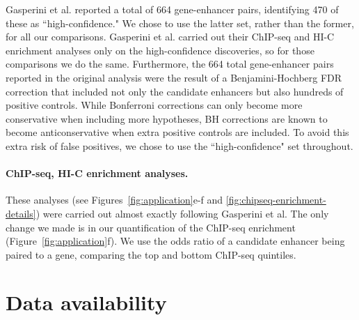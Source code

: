 \documentclass{nature}
\begin{document}
Gasperini et al. reported a total of 664 gene-enhancer pairs, identifying 470 of these as ``high-confidence." We chose to use the latter set, rather than the former, for all our comparisons. Gasperini et al. carried out their ChIP-seq and HI-C enrichment analyses only on the high-confidence discoveries, so for those comparisons we do the same. Furthermore, the 664 total gene-enhancer pairs reported in the original analysis were the result of a Benjamini-Hochberg FDR correction that included not only the candidate enhancers but also hundreds of positive controls. While Bonferroni corrections can only become more conservative when including more hypotheses, BH corrections are known to become anticonservative when extra positive controls are included\cite{FR01}. To avoid this extra risk of false positives, we chose to use the ``high-confidence" set throughout.

\paragraph{ChIP-seq, HI-C enrichment analyses.}

These analyses (see Figures~\ref{fig:application}e-f and \ref{fig:chipseq-enrichment-details}) were carried out almost exactly following Gasperini et al. The only change we made is in our quantification of the ChIP-seq enrichment (Figure~\ref{fig:application}f). We use the odds ratio of a candidate enhancer being paired to a gene, comparing the top and bottom ChIP-seq quintiles.

%

\section*{Data availability}
\end{document}
